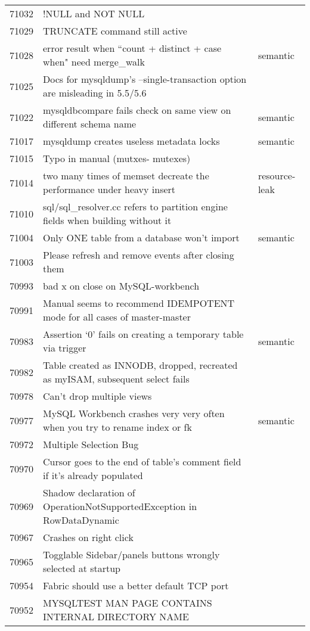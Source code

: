 \begin{longtable}[c]{p{1cm}p{10cm}p{1cm}}
71032 & !NULL and NOT NULL &  \\
71029 & TRUNCATE command still active &  \\
71028 & error result when ``count + distinct + case when" need merge\_walk & semantic \\
71025 & Docs for mysqldump's --single-transaction option are misleading in 5.5/5.6 &  \\
71022 & mysqldbcompare fails check on same view on different schema name & semantic \\
71017 & mysqldump creates useless metadata locks & semantic \\
71015 & Typo in manual (mutxes- mutexes) &  \\
71014 & two many times of memset decreate the performance under heavy insert & resource-leak \\
71010 & sql/sql\_resolver.cc refers to partition engine fields when building without it &  \\
71004 & Only ONE table from a database won't import & semantic \\
71003 & Please refresh and remove events after closing them &  \\
70993 & bad x on close on MySQL-workbench &  \\
70991 & Manual seems to recommend IDEMPOTENT mode for all cases of master-master &  \\
70983 & Assertion `0' fails on creating a temporary table via trigger & semantic \\
70982 & Table created as INNODB, dropped, recreated as myISAM, subsequent select fails &  \\
70978 & Can't drop multiple views &  \\
70977 & MySQL Workbench crashes very very often when you try to rename index or fk & semantic \\
70972 & Multiple Selection Bug &  \\
70970 & Cursor goes to the end of table's comment field if it's already populated &  \\
70969 & Shadow declaration of OperationNotSupportedException in RowDataDynamic &  \\
70967 & Crashes on right click &  \\
70965 & Togglable Sidebar/panels buttons wrongly selected at startup &  \\
70954 & Fabric should use a better default TCP port &  \\
70952 & MYSQLTEST MAN PAGE CONTAINS INTERNAL DIRECTORY NAME &  \\

\end{longtable}
